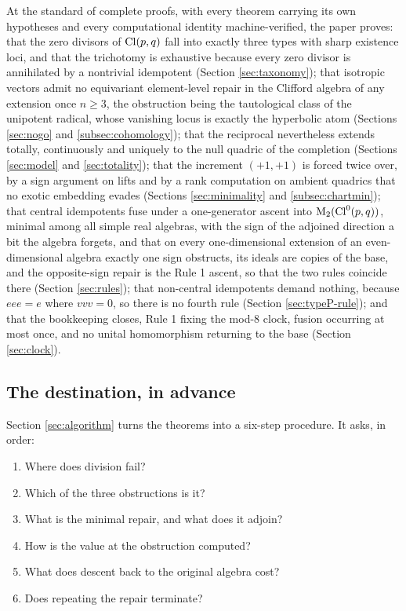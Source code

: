 At the standard of complete proofs, with every theorem carrying its own hypotheses and every computational identity machine-verified, the paper proves: that the zero divisors of $\mathrm{Cl}(p,q)$ fall into exactly three types with sharp existence loci, and that the trichotomy is exhaustive because every zero divisor is annihilated by a nontrivial idempotent (Section \ref{sec:taxonomy}); that isotropic vectors admit no equivariant element-level repair in the Clifford algebra of any extension once $n \geq 3$, the obstruction being the tautological class of the unipotent radical, whose vanishing locus is exactly the hyperbolic atom (Sections \ref{sec:nogo} and \ref{subsec:cohomology}); that the reciprocal nevertheless extends totally, continuously and uniquely to the null quadric of the completion (Sections \ref{sec:model} and \ref{sec:totality}); that the increment $(+1,+1)$ is forced twice over, by a sign argument on lifts and by a rank computation on ambient quadrics that no exotic embedding evades (Sections \ref{sec:minimality} and \ref{subsec:chartmin}); that central idempotents fuse under a one-generator ascent into $\mathrm{M}_2(\mathrm{Cl}^0(p,q))$, minimal among all simple real algebras, with the sign of the adjoined direction a bit the algebra forgets, and that on every one-dimensional extension of an even-dimensional algebra exactly one sign obstructs, its ideals are copies of the base, and the opposite-sign repair is the Rule 1 ascent, so that the two rules coincide there (Section \ref{sec:rules}); that non-central idempotents demand nothing, because $eee = e$ where $vvv = 0$, so there is no fourth rule (Section \ref{sec:typeP-rule}); and that the bookkeeping closes, Rule 1 fixing the mod-8 clock, fusion occurring at most once, and no unital homomorphism returning to the base (Section \ref{sec:clock}).

\subsection*{The destination, in advance}

Section \ref{sec:algorithm} turns the theorems into a six-step procedure. It asks, in order:

\begingroup
\setlength{\topsep}{4pt}\setlength{\partopsep}{0pt}
\begin{enumerate}
\setlength{\itemsep}{1pt}\setlength{\parsep}{0pt}
\item Where does division fail?
\item Which of the three obstructions is it?
\item What is the minimal repair, and what does it adjoin?
\item How is the value at the obstruction computed?
\item What does descent back to the original algebra cost?
\item Does repeating the repair terminate?
\end{enumerate}
\endgroup

